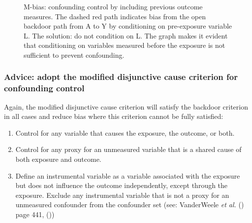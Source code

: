 \documentclass[
  singlecolumn]{article}
\providecommand{\tightlist}{%
  \setlength{\itemsep}{0pt}\setlength{\parskip}{0pt}}\usepackage{longtable,booktabs,array}
\begin{document}
\begin{figure}


\caption{\label{fig-m-bias}M-bias: confounding control by including
previous outcome measures. The dashed red path indicates bias from the
open backdoor path from A to Y by conditioning on pre-exposure variable
L. The solution: do not condition on L. The graph makes it evident that
conditioning on variables measured before the exposure is not sufficient
to prevent confounding.}

\end{figure}%

\subsubsection{Advice: adopt the modified disjunctive cause criterion
for confounding
control}\label{advice-adopt-the-modified-disjunctive-cause-criterion-for-confounding-control}

Again, the modified disjunctive cause criterion will satisfy the
backdoor criterion in all cases and reduce bias where this criterion
cannot be fully satisfied:

\begin{enumerate}
\def\labelenumi{\alph{enumi}.}
\tightlist
\item
  Control for any variable that causes the exposure, the outcome, or
  both.
\item
  Control for any proxy for an unmeasured variable that is a shared
  cause of both exposure and outcome.
\item
  Define an instrumental variable as a variable associated with the
  exposure but does not influence the outcome independently, except
  through the exposure. Exclude any instrumental variable that is not a
  proxy for an unmeasured confounder from the confounder set (see:
  VanderWeele \emph{et al.} () page
  441, ())
\end{enumerate}
\end{document}
